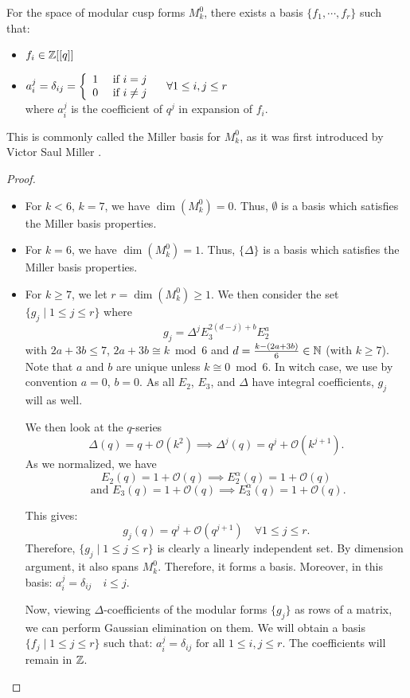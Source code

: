 \begin{theorem}
	For the space of modular cusp forms $M_k^0$, there exists a basis $\{f_1, \cdots, f_r\}$ such that:
	\begin{itemize}
		\item $f_i \in \mathbb{Z}[[q]]$
		\item $ a_i^j = \delta_{ij} = 
		\left\lbrace
		\begin{array}{l l}
			1 & \text{ if } i   =  j \\
			0 & \text{ if } i \neq j
		\end{array}
		\right. \quad
		\forall 1 \leq i,j \leq r$\\
		where $a_i^j$ is the coefficient of $q^j$ in expansion of $f_i$.
	\end{itemize}
\end{theorem}
This is commonly called the Miller basis for $M_k^0$, as it was first introduced by Victor Saul Miller \cite{MillerThesis}.
\begin{proof}
	\begin{itemize}
		\item For $k<6$, $k=7$, we have $\dim(M_k^0)=0$.
		Thus, $\emptyset$ is a basis which satisfies the Miller basis properties.
		
		\item For $k=6$, we have $\dim(M_k^0)=1$.
		Thus, $\{ \Delta \}$ is a basis which satisfies the Miller basis properties.
		
		\item For $k \geq 7$, we let $r = \dim(M_k^0) \geq 1$.	
		We then consider the set $\{ g_j \mid 1 \leq j \leq r \}$ where
		$$
		g_j = \Delta^jE_3^{2(d-j)+b}E_2^a
		$$
		with $2a+3b \leq 7$, $2a+3b \cong k \bmod 6$ and $d = \frac{k-(2a+3b)}{6} \in \mathbb{N}$ (with $k \geq 7$).
		Note that $a$ and $b$ are unique unless $k \cong 0 \bmod 6$. In witch case, we use by convention $a=0$, $b=0$.
		As all $E_2$, $E_3$, and $\Delta$ have integral coefficients, $g_j$ will as well.
		
		We then look at the $q$-series
		$$
		\Delta(q) = q + \mathcal{O}(k^2) \implies \Delta^j(q) = q^j + \mathcal{O}(k^{j+1}).
		$$
		As we normalized, we have
		$$
		E_2(q) = 1 + \mathcal{O}(q) \implies E_2^{\alpha}(q) = 1 + \mathcal{O}(q)
		$$
		$$
		\text{ and } E_3(q) = 1 + \mathcal{O}(q) \implies E_3^{\alpha}(q) = 1 + \mathcal{O}(q).
		$$
		
		This gives:
		$$
		g_j(q) = q^j + \mathcal{O}(q^{j+1}) \quad \forall 1 \leq j \leq r.
		$$
		Therefore, $\{ g_j \mid 1 \leq j \leq r \}$ is clearly a linearly independent set. By dimension argument, it also spans $M_k^0$. Therefore, it forms a basis.
		Moreover, in this basis: $a_i^j = \delta_{ij} \quad i \leq j$.
		
		Now, viewing $\Delta$-coefficients of the modular forms $\{g_j\}$ as rows of a matrix, we can perform Gaussian elimination on them.
		We will obtain a basis $\{f_j \mid 1 \leq j \leq r \}$ such that: $a_i^j = \delta_{ij} \text{ for all } 1 \leq i,j \leq r$.
		The coefficients will remain in $\mathbb{Z}$.
	\end{itemize}
\end{proof}

